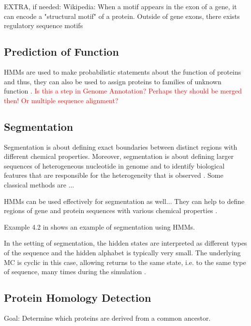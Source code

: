 \documentclass{article}
\begin{document}
EXTRA, if needed: 
Wikipedia: When a motif appears in the exon of a gene, it can encode a "structural motif" of a protein. Outside of gene exons, there exists regulatory sequence motifs 

\subsection{Prediction of Function}
HMMs are used to make probabilistic statements about the function of proteins and thus, they can also be used to assign proteins to families of unknown function \cite{Christianini2006}. \textcolor{red}{Is this a step in Genome Annotation? Perhaps they should be merged then! Or multiple sequence alignment?}

\subsection{Segmentation}
Segmentation is about defining exact boundaries between distinct regions with different chemical properties. Moreover, segmentation is about defining larger sequences of heterogeneous nucleotide in genome and to identify biological features that are responsible for the heterogeneity that is observed \cite{Christianini2006}. Some classical methods are ...

HMMs can be used effectively for segmentation as well... They can help to define regions of gene and protein sequences with various chemical properties \cite{Christianini2006}. 

Example 4.2 in \cite{Christianini2006} shows an example of segmentation using HMMs.

In the setting of segmentation, the hidden states are interpreted as different types of the sequence and the hidden alphabet is typically very small. The underlying MC is cyclic in this case, allowing returns to the same state, i.e. to the same type of sequence, many times during the simulation \cite{Christianini2006}. 

\subsection{Protein Homology Detection}
Goal: Determine which proteins are derived from a common ancestor. 
\end{document}
